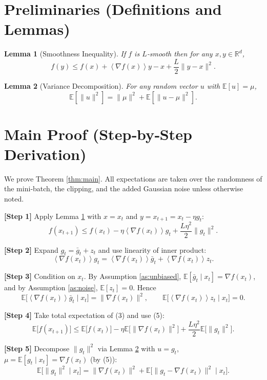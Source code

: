 \documentclass[11pt]{article}
\newtheorem{lemma}{Lemma}
\newcommand{\E}{\mathbb{E}}
\newcommand{\R}{\mathbb{R}}
\newcommand{\inner}[1]{\left\langle#1\right\rangle}
\newcommand{\grad}{\nabla}
\begin{document}
\section*{Preliminaries (Definitions and Lemmas)}
\begin{lemma}[Smoothness Inequality]\label{lem:smooth}
If $f$ is $L$‑smooth then for any $x,y\in\R^{d}$,
\[
f(y)\le f(x)+\inner{\grad f(x)}{y-x}+\frac{L}{2}\|y-x\|^{2}.
\]
\end{lemma}
\begin{lemma}[Variance Decomposition]\label{lem:var}
For any random vector $u$ with $\E[u]=\mu$, 
\[
\E[\|u\|^{2}]=\|\mu\|^{2}+\E[\|u-\mu\|^{2}].
\]
\end{lemma}

\section*{Main Proof (Step‑by‑Step Derivation)}
We prove Theorem \ref{thm:main}. All expectations are taken over the randomness of the mini‑batch, the clipping, and the added Gaussian noise unless otherwise noted.

\noindent\textbf{[Step 1]} Apply Lemma \ref{lem:smooth} with $x=x_{t}$ and $y=x_{t+1}=x_{t}-\eta g_{t}$:
\[
f(x_{t+1})\le f(x_{t})-\eta\inner{\grad f(x_{t})}{g_{t}}+\frac{L\eta^{2}}{2}\|g_{t}\|^{2}.
\tag{3}
\]

\noindent\textbf{[Step 2]} Expand $g_{t}=\bar g_{t}+z_{t}$ and use linearity of inner product:
\[
\inner{\grad f(x_{t})}{g_{t}}
= \inner{\grad f(x_{t})}{\bar g_{t}} + \inner{\grad f(x_{t})}{z_{t}}.
\tag{4}
\]

\noindent\textbf{[Step 3]} Condition on $x_{t}$. By Assumption \ref{as:unbiased}, $\E[\bar g_{t}\mid x_{t}]=\grad f(x_{t})$, and by Assumption \ref{as:noise}, $\E[z_{t}]=0$. Hence
\[
\E\!\bigl[\inner{\grad f(x_{t})}{\bar g_{t}} \mid x_{t}\bigr]=\|\grad f(x_{t})\|^{2},
\qquad
\E\!\bigl[\inner{\grad f(x_{t})}{z_{t}}\mid x_{t}\bigr]=0.
\tag{5}
\]

\noindent\textbf{[Step 4]} Take total expectation of (3) and use (5):
\[
\E\!\bigl[f(x_{t+1})\bigr]
\le \E\!\bigl[f(x_{t})\bigr]
-\eta\E\!\bigl[\|\grad f(x_{t})\|^{2}\bigr]
+\frac{L\eta^{2}}{2}\E\!\bigl[\|g_{t}\|^{2}\bigr].
\tag{6}
\]

\noindent\textbf{[Step 5]} Decompose $\|g_{t}\|^{2}$ via Lemma \ref{lem:var} with $u=g_{t}$, $\mu=\E[g_{t}\mid x_{t}]=\grad f(x_{t})$ (by (5)):
\[
\E\!\bigl[\|g_{t}\|^{2}\mid x_{t}\bigr]
= \|\grad f(x_{t})\|^{2}
+ \E\!\bigl[\|g_{t}-\grad f(x_{t})\|^{2}\mid x_{t}\bigr].
\tag{7}
\]
\end{document}

